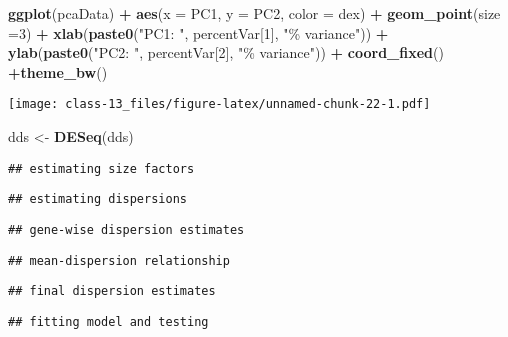 \documentclass[
]{article}
\newenvironment{Shaded}{\begin{snugshade}}{\end{snugshade}}
\newcommand{\AttributeTok}[1]{\textcolor[rgb]{0.13,0.29,0.53}{#1}}
\newcommand{\DecValTok}[1]{\textcolor[rgb]{0.00,0.00,0.81}{#1}}
\newcommand{\FunctionTok}[1]{\textcolor[rgb]{0.13,0.29,0.53}{\textbf{#1}}}
\newcommand{\NormalTok}[1]{#1}
\newcommand{\OtherTok}[1]{\textcolor[rgb]{0.56,0.35,0.01}{#1}}
\newcommand{\SpecialCharTok}[1]{\textcolor[rgb]{0.81,0.36,0.00}{\textbf{#1}}}
\newcommand{\StringTok}[1]{\textcolor[rgb]{0.31,0.60,0.02}{#1}}
\begin{document}
\begin{Shaded}
\begin{Highlighting}[]
\FunctionTok{ggplot}\NormalTok{(pcaData) }\SpecialCharTok{+}
  \FunctionTok{aes}\NormalTok{(}\AttributeTok{x =}\NormalTok{ PC1, }\AttributeTok{y =}\NormalTok{ PC2, }\AttributeTok{color =}\NormalTok{ dex) }\SpecialCharTok{+}
  \FunctionTok{geom\_point}\NormalTok{(}\AttributeTok{size =}\DecValTok{3}\NormalTok{) }\SpecialCharTok{+}
  \FunctionTok{xlab}\NormalTok{(}\FunctionTok{paste0}\NormalTok{(}\StringTok{"PC1: "}\NormalTok{, percentVar[}\DecValTok{1}\NormalTok{], }\StringTok{"\% variance"}\NormalTok{)) }\SpecialCharTok{+}
  \FunctionTok{ylab}\NormalTok{(}\FunctionTok{paste0}\NormalTok{(}\StringTok{"PC2: "}\NormalTok{, percentVar[}\DecValTok{2}\NormalTok{], }\StringTok{"\% variance"}\NormalTok{)) }\SpecialCharTok{+}
  \FunctionTok{coord\_fixed}\NormalTok{() }\SpecialCharTok{+}\FunctionTok{theme\_bw}\NormalTok{()}
\end{Highlighting}
\end{Shaded}

\texttt{[image: class-13\_files/figure-latex/unnamed-chunk-22-1.pdf]}

\begin{Shaded}
\begin{Highlighting}[]
\NormalTok{dds }\OtherTok{\textless{}{-}} \FunctionTok{DESeq}\NormalTok{(dds)}
\end{Highlighting}
\end{Shaded}

\begin{verbatim}
## estimating size factors
\end{verbatim}

\begin{verbatim}
## estimating dispersions
\end{verbatim}

\begin{verbatim}
## gene-wise dispersion estimates
\end{verbatim}

\begin{verbatim}
## mean-dispersion relationship
\end{verbatim}

\begin{verbatim}
## final dispersion estimates
\end{verbatim}

\begin{verbatim}
## fitting model and testing
\end{verbatim}
\end{document}
